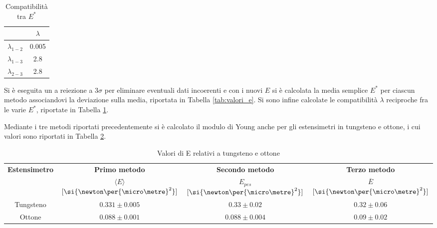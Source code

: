 \documentclass[a4paper,11pt,oneside]{article}
\begin{document}
\begin{table}
\caption{Compatibilità tra $E^{\ast}$}
\label{tab:compatibilità_e_star}
\centering
    \begin{tabular}{|c|c|}
        \hline
        & $\lambda$\\ \hline
        {\cellcolor[rgb]{0.85,0.85,0.85}}$\lambda_{1-2}$ & {\cellcolor[rgb]{0.85,0.85,0.85}}0.005\\ \hline
        $\lambda_{1-3}$ & 2.8\\ \hline
        {\cellcolor[rgb]{0.85,0.85,0.85}}$\lambda_{2-3}$ & {\cellcolor[rgb]{0.85,0.85,0.85}}2.8 \\ \hline
    \end{tabular}
\end{table}

Si è eseguita un a reiezione a $3\sigma$ per eliminare eventuali dati incoerenti e con i nuovi $E$ si è calcolata la media semplice $E^{\ast}$ per ciascun metodo associandovi la deviazione sulla media, riportata in Tabella \ref{tab:valori_e}. Si sono infine calcolate le compatibilità $\lambda$ reciproche fra le varie $E^{\ast}$, riportate in Tabella \ref{tab:compatibilità_e_star}.



Mediante i tre metodi riportati precedentemente si è calcolato il modulo di Young anche per gli estensimetri in tungsteno e ottone, i cui valori sono riportati in Tabella \ref{tab:tungsteno_ottone}.



\begin{table}[h!]
    \centering
    \caption{Valori di E relativi a tungsteno e ottone}
    \label{tab:tungsteno_ottone}
    \begin{tabular}{|c|c|c|c|}
        \hline
        \multirow{2}{*}{\textbf{Estensimetro}} & \textbf{Primo metodo} & \textbf{Secondo metodo} & \textbf{Terzo metodo} \\
		& $\langle E \rangle$ $[\si{\newton\per{\micro\metre}^2}]$ &    $E_{pes}$ $[\si{\newton\per{\micro\metre}^2}]$ &  $\overline{E}$ $[\si{\newton\per{\micro\metre}^2}]$\\  \hline
        {\cellcolor[rgb]{0.85,0.85,0.85}}Tungsteno & {\cellcolor[rgb]{0.85,0.85,0.85}}$0.331 \pm 0.005$ & {\cellcolor[rgb]{0.85,0.85,0.85}}$0.33 \pm 0.02$ & {\cellcolor[rgb]{0.85,0.85,0.85}}$0.32 \pm 0.06$\\ \hline
        Ottone & $0.088 \pm 0.001$ & $0.088 \pm 0.004$ & $0.09 \pm 0.02$\\ \hline
    \end{tabular}
\end{table}
\end{document}
